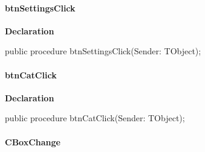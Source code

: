 \documentclass{report}
\newif\ifpdf
\begin{document}
\paragraph*{btnSettingsClick}\hspace*{\fill}

\label{manager.TMnFrm-btnSettingsClick}
\begin{list}{}{
\setlength{\itemindent}{0cm}
\setlength{\listparindent}{0cm}
\setlength{\leftmargin}{\evensidemargin}
\addtolength{\leftmargin}{\tmplength}
\settowidth{\labelsep}{X}
\addtolength{\leftmargin}{\labelsep}
\setlength{\labelwidth}{\tmplength}
}
\item[\textbf{Declaration}\hfill]
\ifpdf
\begin{flushleft}
\fi
\begin{ttfamily}
public procedure btnSettingsClick(Sender: TObject);\end{ttfamily}

\ifpdf
\end{flushleft}
\fi

\end{list}
\paragraph*{btnCatClick}\hspace*{\fill}

\label{manager.TMnFrm-btnCatClick}
\begin{list}{}{
\setlength{\itemindent}{0cm}
\setlength{\listparindent}{0cm}
\setlength{\leftmargin}{\evensidemargin}
\addtolength{\leftmargin}{\tmplength}
\settowidth{\labelsep}{X}
\addtolength{\leftmargin}{\labelsep}
\setlength{\labelwidth}{\tmplength}
}
\item[\textbf{Declaration}\hfill]
\ifpdf
\begin{flushleft}
\fi
\begin{ttfamily}
public procedure btnCatClick(Sender: TObject);\end{ttfamily}

\ifpdf
\end{flushleft}
\fi

\end{list}
\paragraph*{CBoxChange}\hspace*{\fill}
\end{document}
